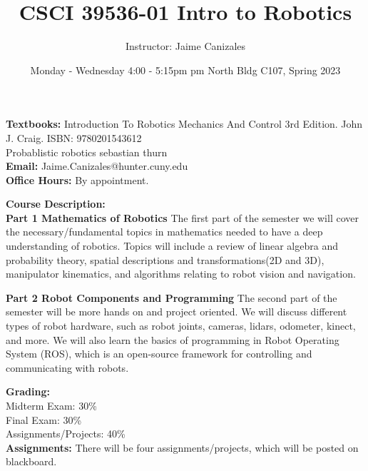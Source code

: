 \documentclass[a4paper]{article}
\title{CSCI 39536-01 Intro to Robotics}
\author{Instructor: Jaime Canizales}
\date{Monday - Wednesday 4:00 - 5:15pm pm North Bldg C107, Spring 2023}
\begin{document}
\maketitle

\textbf{Textbooks:} Introduction To Robotics Mechanics And Control 3rd Edition. John J. Craig. ISBN: 9780201543612\\
Probablistic robotics sebastian thurn\\

\textbf{Email:} Jaime.Canizales@hunter.cuny.edu \\
\textbf{Office Hours:} By appointment.

\textbf{Course Description:}\\ 
\textbf{Part 1 Mathematics of Robotics}
The first part of the semester we will cover the necessary/fundamental topics in mathematics needed to have a deep understanding of robotics. Topics will include a review of linear algebra and probability theory, spatial descriptions and transformations(2D and 3D), manipulator kinematics, and algorithms relating to robot vision and navigation.

\textbf{Part 2 Robot Components and Programming}
The second part of the semester will be more hands on and project oriented. We will discuss different types of robot hardware, such as robot joints, cameras, lidars, odometer, kinect, and more. We will also learn the basics of programming in Robot Operating System (ROS), which is an open-source framework for controlling and communicating with robots.

\textbf{Grading: } \\
Midterm Exam: \hspace{11mm} 30\% \\
Final Exam: \hspace{17mm} 30\% \\
Assignments/Projects: \hspace{1mm} 40\% \\

\textbf{Assignments: } There will be four assignments/projects, which will be posted on blackboard.
\end{document}
